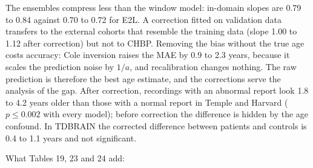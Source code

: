 \documentclass[11pt,a4paper]{article}
\begin{document}
The ensembles compress less than the window model: in-domain slopes are 0.79 to 0.84 against 0.70 to 0.72 for E2L. A correction fitted on validation data transfers to the external cohorts that resemble the training data (slope 1.00 to 1.12 after correction) but not to CHBP. Removing the bias without the true age costs accuracy: Cole inversion raises the MAE by 0.9 to 2.3 years, because it scales the prediction noise by $1/a$, and recalibration changes nothing. The raw prediction is therefore the best age estimate, and the corrections serve the analysis of the gap. After correction, recordings with an abnormal report look 1.8 to 4.2 years older than those with a normal report in Temple and Harvard ($p \le 0.002$ with every model); before correction the difference is hidden by the age confound. In TDBRAIN the corrected difference between patients and controls is 0.4 to 1.1 years and not significant.

What Tables 19, 23 and 24 add:
\end{document}
